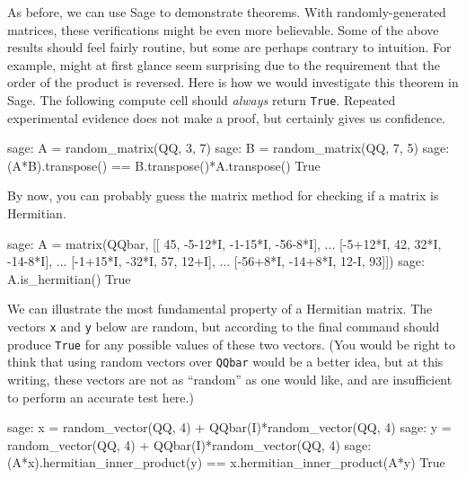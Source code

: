 As before, we can use Sage to demonstrate theorems.  With randomly-generated matrices, these verifications might be even more believable.  Some of the above results should feel fairly routine, but some are perhaps contrary to intuition.  For example,  might at first glance seem surprising due to the requirement that the order of the product is reversed.  Here is how we would investigate this theorem in Sage.  The following compute cell should \emph{always} return \verb?True?.  Repeated experimental evidence does not make a proof, but certainly gives us confidence.
%
\begin{sageexample}
sage: A = random_matrix(QQ, 3, 7)
sage: B = random_matrix(QQ, 7, 5)
sage: (A*B).transpose() == B.transpose()*A.transpose()
True
\end{sageexample}
%
By now, you can probably guess the matrix method for checking if a matrix is Hermitian.
%
\begin{sageexample}
sage: A = matrix(QQbar, [[     45, -5-12*I, -1-15*I, -56-8*I],
...                      [-5+12*I,      42,    32*I, -14-8*I],
...                      [-1+15*I,   -32*I,      57,    12+I],
...                      [-56+8*I, -14+8*I,    12-I,      93]])
sage: A.is_hermitian()
True
\end{sageexample}
%
We can illustrate the most fundamental property of a Hermitian matrix.  The vectors \verb?x? and \verb?y? below are random, but according to  the final command should produce \verb?True? for any possible values of these two vectors.   (You would be right to think that using random vectors over \verb?QQbar? would be a better idea, but at this writing, these vectors are not as ``random'' as one would like, and are insufficient to perform an accurate test here.)
%
\begin{sageexample}
sage: x = random_vector(QQ, 4) + QQbar(I)*random_vector(QQ, 4)
sage: y = random_vector(QQ, 4) + QQbar(I)*random_vector(QQ, 4)
sage: (A*x).hermitian_inner_product(y) == x.hermitian_inner_product(A*y)
True
\end{sageexample}
%
\begin{sageverbatim}
\end{sageverbatim}
%
